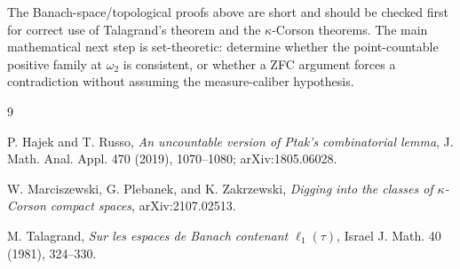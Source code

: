 \documentclass[11pt]{article}
\newcommand{\omegatwo}{\omega_2}
\begin{document}
The Banach-space/topological proofs above are short and should be checked
first for correct use of Talagrand's theorem and the \(\kappa\)-Corson
theorems.  The main mathematical next step is set-theoretic: determine whether
the point-countable positive family at \(\omegatwo\) is consistent, or whether
a ZFC argument forces a contradiction without assuming the measure-caliber
hypothesis.

\begin{thebibliography}{9}

P. Hajek and T. Russo,
\emph{An uncountable version of Ptak's combinatorial lemma},
J. Math. Anal. Appl. 470 (2019), 1070--1080; arXiv:1805.06028.

W. Marciszewski, G. Plebanek, and K. Zakrzewski,
\emph{Digging into the classes of \(\kappa\)-Corson compact spaces},
arXiv:2107.02513.

M. Talagrand,
\emph{Sur les espaces de Banach contenant \(\ell_1(\tau)\)},
Israel J. Math. 40 (1981), 324--330.

\end{thebibliography}
\end{document}
